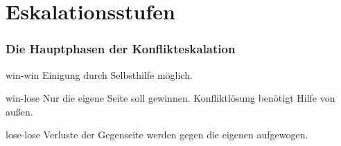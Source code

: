 \documentclass[
	ngerman,
	xcolor=dvipsnames,
	11pt
	]{beamer}
\begin{document}
\section{Eskalationsstufen}
\begin{frame}
	\frametitle{Die Hauptphasen der Konflikteskalation}
		\begin{block}{win-win}
			Einigung durch Selbsthilfe möglich.
		\end{block}\pause
		\begin{block}{win-lose}
			Nur die eigene Seite soll gewinnen. Konfliktlösung benötigt Hilfe von außen.
		\end{block}\pause
		\begin{block}{lose-lose}
			Verluste der Gegenseite werden gegen die eigenen aufgewogen.
		\end{block}
\end{frame}
\end{document}

